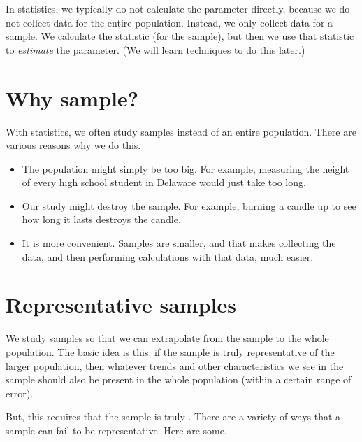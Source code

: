 \documentclass[../../../main.tex]{subfiles}
\begin{document}
In statistics, we typically do not calculate the parameter directly, because we do not collect data for the entire population. Instead, we only collect data for a sample. We calculate the statistic (for the sample), but then we use that statistic to \emph{estimate} the parameter. (We will learn techniques to do this later.)


\section{Why sample?}

With statistics, we often study samples instead of an entire population. There are various reasons why we do this. 

\begin{itemize}

\item The population might simply be too big. For example, measuring the height of every high school student in Delaware would just take too long.

\item Our study might destroy the sample. For example, burning a candle up to see how long it lasts destroys the candle.

\item It is more convenient. Samples are smaller, and that makes collecting the data, and then performing calculations with that data, much easier.

\end{itemize}


\section{Representative samples}

We study samples so that we can extrapolate from the sample to the whole population. The basic idea is this: if the sample is truly representative of the larger population, then whatever trends and other characteristics we see in the sample should also be present in the whole population (within a certain range of error).

But, this requires that the sample is truly . There are a variety of ways that a sample can fail to be representative. Here are some.
\end{document}
